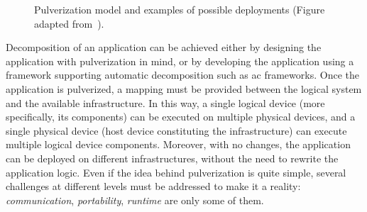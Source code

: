 \documentclass[12pt,a4paper]{article}
\begin{document}
\begin{figure}[ht]
\begin{minipage}{\columnwidth}
\begin{minipage}{0.48\columnwidth}
		\end{minipage}
	\end{minipage}

	\caption{
		Pulverization model and examples of possible deployments (Figure adapted from~\cite{DBLP:journals/fi/CasadeiPPVW20}).
	}
	\label{fig:pulv}
\end{figure}
%
Decomposition of an application can be achieved either by designing the application with pulverization in mind,
or by developing the application using a framework supporting automatic decomposition such as \ac{ac} frameworks.
%
Once the application is pulverized,
a mapping must be provided between the logical system and the available infrastructure.
%
In this way,
a single logical device (more specifically, its components) can be executed on multiple physical devices,
and a single physical device (host device constituting the infrastructure) can execute multiple logical device components.
%
Moreover,
with no changes,
the application can be deployed on different infrastructures,
without the need to rewrite the application logic.
%
Even if the idea behind pulverization is quite simple,
several challenges at different levels must be addressed to make it a reality:
\emph{communication}, \emph{portability}, \emph{runtime} are only some of them.
\end{document}
